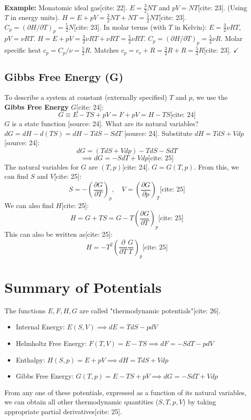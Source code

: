 \documentclass[11pt]{article}
\newcommand{\pderiv}[2]{\frac{\partial #1}{\partial #2}}
\newcommand{\gasR}{R}
\begin{document}
\textbf{Example:} Monatomic ideal gas[cite: 22].
$E = \frac{3}{2}NT$ and $pV = NT$[cite: 23]. (Using $T$ in energy units).
$H = E + pV = \frac{3}{2} NT + NT = \frac{5}{2} NT$[cite: 23].
$C_p = (\partial H / \partial T)_p = \frac{5}{2} N$[cite: 23].
In molar terms (with $T$ in Kelvin): $E = \frac{3}{2} \nu \gasR T$, $pV = \nu \gasR T$.
$H = E + pV = \frac{3}{2} \nu \gasR T + \nu \gasR T = \frac{5}{2} \nu \gasR T$.
$C_p = (\partial H / \partial T)_p = \frac{5}{2} \nu \gasR$.
Molar specific heat $c_p = C_p/\nu = \frac{5}{2} \gasR$. Matches $c_p = c_v + R = \frac{3}{2}\gasR + \gasR = \frac{5}{2}\gasR$[cite: 23]. $\checkmark$

\subsection*{Gibbs Free Energy (G)} %

To describe a system at constant (externally specified) $T$ and $p$, we use the \textbf{Gibbs Free Energy} $G$[cite: 24]:
\[ G \equiv E - TS + pV = F + pV = H - TS \text{[cite: 24]} \]
$G$ is a state function [source: 24]. What are its natural variables?
$dG = dH - d(TS) = dH - T dS - S dT$ [source: 24].
Substitute $dH = T dS + V dp$ [source: 24]:
\[ dG = (T dS + V dp) - T dS - S dT \]
\[ \implies dG = -S dT + V dp \text{[cite: 25]} \]
The natural variables for $G$ are $(T, p)$[cite: 24]. $G=G(T,p)$.
From this, we can find $S$ and $V$[cite: 25]:
\[ S = - \left( \pderiv{G}{T} \right)_p, \quad V = \left( \pderiv{G}{p} \right)_T \text{[cite: 25]} \]
We can also find $H$[cite: 25]:
\[ H = G + TS = G - T \left( \pderiv{G}{T} \right)_p \text{[cite: 25]} \]
This can also be written as[cite: 25]:
\[ H = -T^2 \left( \pderiv{}{T} \frac{G}{T} \right)_p \text{[cite: 25]} \]

\section*{Summary of Potentials}

The functions $E, F, H, G$ are called "thermodynamic potentials"[cite: 26].
\begin{itemize}
    \item Internal Energy: $E(S,V) \implies dE = T dS - p dV$
    \item Helmholtz Free Energy: $F(T,V) = E-TS \implies dF = -S dT - p dV$
    \item Enthalpy: $H(S,p) = E+pV \implies dH = T dS + V dp$
    \item Gibbs Free Energy: $G(T,p) = E-TS+pV \implies dG = -S dT + V dp$
\end{itemize}
From any one of these potentials, expressed as a function of its natural variables, we can obtain all other thermodynamic quantities ($S, T, p, V$) by taking appropriate partial derivatives[cite: 25].
\end{document}
